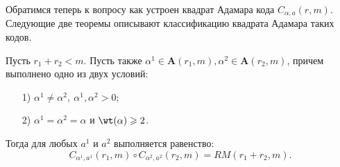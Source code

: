 Обратимся теперь к вопросу как устроен квадрат Адамара кода \(C_{\alpha, a}(r,m)\).
Следующие две теоремы описывают классификацию квадрата Адамара таких кодов.


\begin{theorem}
	\label{SquareOfAlpha11}
	Пусть \(r_1+r_2 < m\).
	Пусть также \(\alpha^1\in\mathbf{A}(r_1,m), \alpha^2\in \mathbf{A}(r_2,m)\), причем выполнено одно из двух условий:
	\begin{itemize}

		\item[1)]\(\alpha^1\neq\alpha^2,\ \alpha^1,\alpha^2>0;\)
		\item[2)]\(\alpha^1=\alpha^2=\alpha\) и \(\wt(\alpha)\geqslant 2\).
	\end{itemize}
	Тогда для любых \(a^1\) и \(a^2\) выполняется равенство:
	\begin{equation}
		\label{CC_R}
		C_{\alpha^1,a^1}(r_1,m)\circ C_{\alpha^2,a^2}(r_2,m)=RM(r_1+r_2,m).
	\end{equation}
\end{theorem}
